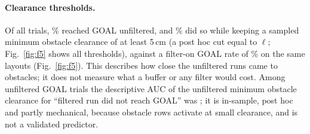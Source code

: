 \documentclass[11pt]{article}
\begin{document}
\paragraph{Clearance thresholds.} Of all trials, \ThrOffGoal\% reached GOAL unfiltered, and
\ThrMatchObstFive\% did so while keeping a sampled minimum obstacle clearance of at least 5\,cm (a
post hoc cut equal to $\ell$; Fig.~\ref{fig:f5} shows all thresholds),
against a filter-on GOAL rate of \ThrOnGoal\% on the same layouts (Fig.~\ref{fig:f5}). This
describes how close the unfiltered runs came to obstacles; it does not measure what a buffer or
any filter would cost. Among unfiltered GOAL trials the descriptive AUC of the unfiltered minimum
obstacle clearance for ``filtered run did not reach GOAL'' was \AucPooled; it is in-sample, post hoc
and partly mechanical, because obstacle rows activate at small clearance, and is not a validated
predictor.
\end{document}
